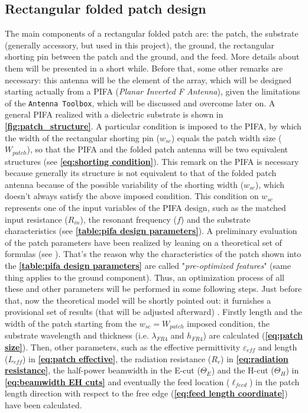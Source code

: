 \documentclass[12pt,a4paper]{article}
\begin{document}
{\newpage
\begin{multicols}{2}
\section*{Rectangular folded patch design}

The main components of a rectangular folded patch are: the patch, the substrate (generally accessory, but used in this project), the ground, the rectangular shorting pin between the patch and the ground, and the feed. More details about them will be presented in a short while. Before that, some other remarks are necessary: this antenna will be the element of the array, which will be designed starting actually from a PIFA (\emph{Planar Inverted F Antenna}), given the limitations of the \texttt{\color{Mahogany}Antenna Toolbox}, which will be discussed and overcome later on. A general PIFA realized with a dielectric substrate is shown in \textbf{\cref{fig:patch_structure}}. A particular condition is imposed to the PIFA, by which the width of the rectangular shorting pin ($w_{sc}$) equals the patch width size ($W_{patch}$), so that the PIFA and the folded patch antenna will be two equivalent structures (see \textbf{\cref{eq:shorting condition}}). This remark on the PIFA is necessary because generally its structure is not equivalent to that of the folded patch antenna because of the possible variability of the shorting width ($w_{sc}$), which doesn't always satisfy the above imposed condition. This condition on $w_{sc}$ represents one of the input variables of the PIFA design, such as the matched input resistance ($R_{in}$), the resonant frequency ($f$) and the substrate characteristics (see \textbf{\cref{table:pifa design parameters}}). A preliminary evaluation of the patch parameters have been realized by leaning on a theoretical set of formulas (see \textbf{\cite{Balanis1}}). That's the reason why the characteristics of the patch shown into the \textbf{\cref{table:pifa design parameters}} are called "\emph{pre-optimized features}" (same thing applies to the ground component). Thus, an optimization process of all these and other parameters will be performed in some following steps. Just before that, now the theoretical model will be shortly pointed out: it furnishes a provisional set of results (that will be adjusted afterward) . Firstly length and the width of the patch starting from the $w_{sc}=W_{patch}$ imposed condition, the substrate wavelength and thickness (i.e. $\lambda_{FR4}$ and $h_{FR4}$) are calculated (\textbf{\cref{eq:patch size}}). Then, other parameters, such as the effective permittivity $\varepsilon_{eff}$  and length ($L_{eff}$) in \textbf{\cref{eq:patch effective}}, the radiation resistance ($R_r$) in \textbf{\cref{eq:radiation resistance}}, the half-power beamwidth in the E-cut ($\Theta_E$) and the H-cut ($\Theta_H$) in \textbf{\cref{eq:beamwidth EH cuts}} and eventually the feed location ($\ell_{feed}$) in the patch length direction with respect to the free edge (\textbf{\cref{eq:feed length coordinate}}) have been calculated. 

\end{multicols}}
\end{document}
